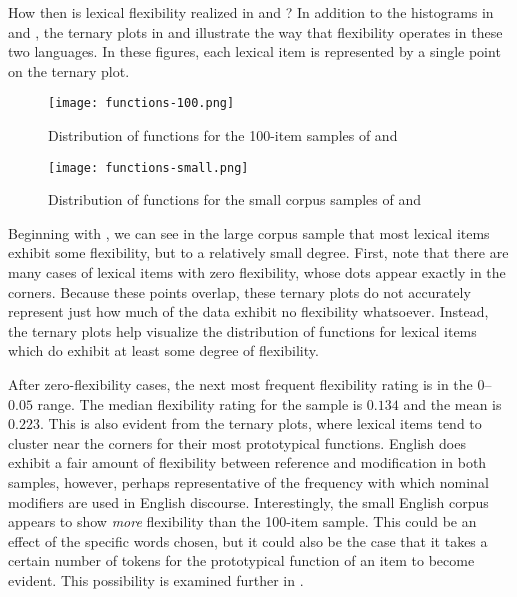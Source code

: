How then is lexical flexibility realized in  and ? In addition to the histograms in  and , the ternary plots in  and  illustrate the way that flexibility operates in these two languages. In these figures, each lexical item is represented by a single point on the ternary plot.

\begin{figure}[h!]
  \centering
  \caption{Distribution of functions for the 100-item samples of  and }
  \label{fig:ternary-100-items}
  \texttt{[image: functions-100.png]}
\end{figure}

\begin{figure}[h!]
  \centering
  \caption{Distribution of functions for the small corpus samples of  and }
  \label{fig:ternary-small-corpus}
  \texttt{[image: functions-small.png]}
\end{figure}

Beginning with , we can see in the large corpus sample that most lexical items exhibit some flexibility, but to a relatively small degree. First, note that there are many cases of lexical items with zero flexibility, whose dots appear exactly in the corners. Because these points overlap, these ternary plots do not accurately represent just how much of the data exhibit no flexibility whatsoever. Instead, the ternary plots help visualize the distribution of functions for lexical items which do exhibit at least some degree of flexibility.

After zero-flexibility cases, the next most frequent flexibility rating is in the $0$–$0.05$ range. The median flexibility rating for the sample is $0.134$ and the mean is $0.223$. This is also evident from the ternary plots, where lexical items tend to cluster near the corners for their most prototypical functions. English does exhibit a fair amount of flexibility between reference and modification in both samples, however, perhaps representative of the frequency with which nominal modifiers are used in English discourse. Interestingly, the small English corpus appears to show \emph{more} flexibility than the 100-item sample. This could be an effect of the specific words chosen, but it could also be the case that it takes a certain number of tokens for the prototypical function of an item to become evident. This possibility is examined further in .

